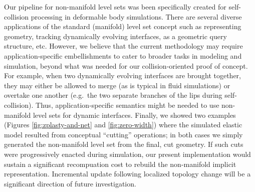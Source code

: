 Our pipeline for non-manifold level sets was been specifically created
for self-collision processing in deformable body simulations. There
are several diverse applications of the standard (manifold) level set
concept such as representing geometry, tracking dynamically evolving
interfaces, as a geometric query structure, etc. However, we believe
that the current methodology may require application-specific
embellishments to cater to broader tasks in modeling and simulation,
beyond what was needed for our collision-oriented proof of concept.
For example, when two dynamically evolving interfaces are brought
together, they may either be allowed to merge (as is typical in fluid
simulations) or overtake one another (e.g.\ the two separate branches
of the lips during self-collision). Thus, application-specific
semantics might be needed to use non-manifold level sets for dynamic
interfaces.  Finally, we showed two examples (Figures
\ref{fig:zplasty-and-net} and \ref{fig:zero-width}) where the
simulated elastic model resulted from conceptual ``cutting''
operations; in both cases we simply generated the non-manifold level
set from the final, cut geometry. If such cuts were progressively
enacted during simulation, our present implementation would sustain a
significant recompuation cost to rebuild the non-manifold implicit
representation. Incremental update following localized topology change
will be a significant direction of future investigation.

